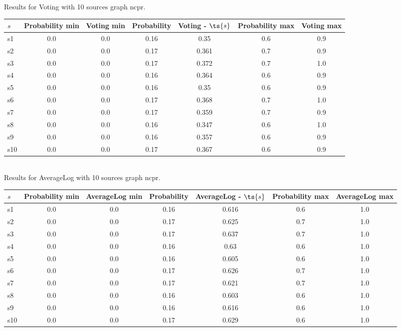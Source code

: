 \documentclass{article}
\begin{document}
\noindent Results for Voting with 10 sources graph ncpr.

\noindent\begin{tabular}{|l|c|c|c|c|c|c|}
\hline
$s$& Probability min & Voting min & Probability & Voting - $\ts{s}$ & Probability max & Voting max\\
\hline
s1 &0.0 & 0.0 & 0.16 & 0.35 & 0.6 & 0.9\\
\hline
s2 &0.0 & 0.0 & 0.17 & 0.361 & 0.7 & 0.9\\
\hline
s3 &0.0 & 0.0 & 0.17 & 0.372 & 0.7 & 1.0\\
\hline
s4 &0.0 & 0.0 & 0.16 & 0.364 & 0.6 & 0.9\\
\hline
s5 &0.0 & 0.0 & 0.16 & 0.35 & 0.6 & 0.9\\
\hline
s6 &0.0 & 0.0 & 0.17 & 0.368 & 0.7 & 1.0\\
\hline
s7 &0.0 & 0.0 & 0.17 & 0.359 & 0.7 & 0.9\\
\hline
s8 &0.0 & 0.0 & 0.16 & 0.347 & 0.6 & 1.0\\
\hline
s9 &0.0 & 0.0 & 0.16 & 0.357 & 0.6 & 0.9\\
\hline
s10 &0.0 & 0.0 & 0.17 & 0.367 & 0.6 & 0.9\\
\hline
\end{tabular}\\

\noindent Results for AverageLog with 10 sources graph ncpr.

\noindent\begin{tabular}{|l|c|c|c|c|c|c|}
\hline
$s$& Probability min & AverageLog min & Probability & AverageLog - $\ts{s}$ & Probability max & AverageLog max\\
\hline
s1 &0.0 & 0.0 & 0.16 & 0.616 & 0.6 & 1.0\\
\hline
s2 &0.0 & 0.0 & 0.17 & 0.625 & 0.7 & 1.0\\
\hline
s3 &0.0 & 0.0 & 0.17 & 0.637 & 0.7 & 1.0\\
\hline
s4 &0.0 & 0.0 & 0.16 & 0.63 & 0.6 & 1.0\\
\hline
s5 &0.0 & 0.0 & 0.16 & 0.605 & 0.6 & 1.0\\
\hline
s6 &0.0 & 0.0 & 0.17 & 0.626 & 0.7 & 1.0\\
\hline
s7 &0.0 & 0.0 & 0.17 & 0.621 & 0.7 & 1.0\\
\hline
s8 &0.0 & 0.0 & 0.16 & 0.603 & 0.6 & 1.0\\
\hline
s9 &0.0 & 0.0 & 0.16 & 0.616 & 0.6 & 1.0\\
\hline
s10 &0.0 & 0.0 & 0.17 & 0.629 & 0.6 & 1.0\\
\hline
\end{tabular}\\
\end{document}
